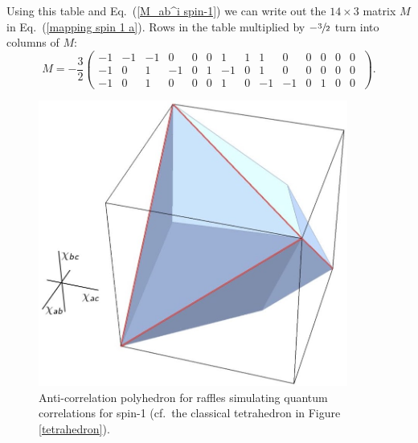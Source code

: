 Using this table and Eq.\ (\ref{M_ab^i spin-1}) we can write out the $14 \times 3$ matrix $M$ in Eq.\ (\ref{mapping spin 1 a}). Rows in the table multiplied by $-\sfrac32$ turn into columns of $M$:
\setcounter{MaxMatrixCols}{14}
\begin{equation}
M = -\frac32
\begin{pmatrix}
-1 & -1 & -1 & 0 & 0 & 0 & 1 & 1 & 1 & 0 & 0 & 0 & 0 & 0 \; \\[.2cm]
-1 & 0 & 1 & -1 & 0 & 1 & -1 & 0 & 1 & 0 & 0 & 0 & 0 & 0 \; \\[.2cm]
-1 & 0 & 1 & 0 & 0 & 0 & 1 & 0 & -1 & -1 & 0 & 1 & 0 & 0 \;
\end{pmatrix}.
\label{components of M spin 1}
\end{equation}

\begin{figure}[ht]
 \centering
   \includegraphics[width=4in]{polytope-spin1.jpeg} 
   \caption{Anti-correlation polyhedron for raffles simulating quantum correlations for spin-1 (cf.\ the classical tetrahedron in Figure \ref{tetrahedron}).}
   \label{polytope-spin1}
\end{figure}

